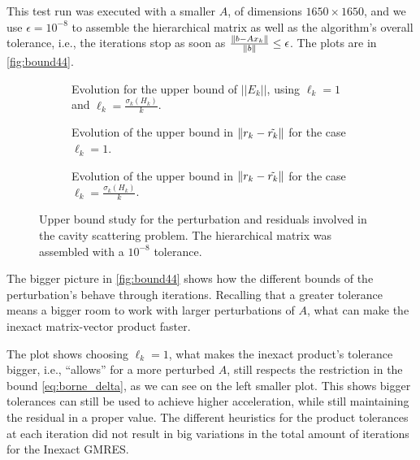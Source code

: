 
This test run was executed with a smaller $A$, of dimensions $1650\times 1650$, and we use $\epsilon = 10^{-8}$ to assemble the hierarchical matrix as well as the algorithm's overall tolerance, i.e., the iterations stop as soon as $\frac{\left\lVert b - Ax_{k}\right\rVert}{\left\lVert b\right\rVert} \leq \epsilon$. The plots are in \autoref{fig:bound44}.

\begin{figure}[h!]
    \centering
    \begin{subfigure}[b]{0.5\linewidth}
        
        \caption{Evolution for the upper bound of $||E_{k}||$, using $\ell_{k}=1$ and $\ell_{k}=\frac{\sigma_{k}(H_{k})}{k}$.}
    \end{subfigure}

    \begin{subfigure}[b]{0.3\linewidth}
        
        \caption{Evolution of the upper bound in $\left\lVert r_{k} - \tilde{r_{k}}\right\rVert$ for the case $\ell_{k}=1$.}
    \end{subfigure}
    \begin{subfigure}[b]{0.3\linewidth}
        
        \caption{Evolution of the upper bound in $\left\lVert r_{k} - \tilde{r_{k}}\right\rVert$ for the case $\ell_{k}=\frac{\sigma_{k}(H_{k})}{k}$.}
    \end{subfigure}
    \caption{Upper bound study for the perturbation and residuals involved in the cavity scattering problem. The hierarchical matrix was assembled with a $10^{-8}$ tolerance.}
    \label{fig:bound44}
\end{figure}

The bigger picture in \autoref{fig:bound44} shows how the different bounds of the perturbation's behave through iterations. Recalling that a greater tolerance means a bigger room to work with larger perturbations of $A$, what can make the inexact matrix-vector product faster.

The plot shows choosing $\ell_{k} = 1$, what makes the inexact product's tolerance bigger, i.e., “allows” for a more perturbed $A$, still respects the restriction in the bound \ref{eq:borne_delta}, as we can see on the left smaller plot. This shows bigger tolerances can still be used to achieve higher acceleration, while still maintaining the residual in a proper value. The different heuristics for the product tolerances at each iteration did not result in big variations in the total amount of iterations for the Inexact GMRES.


